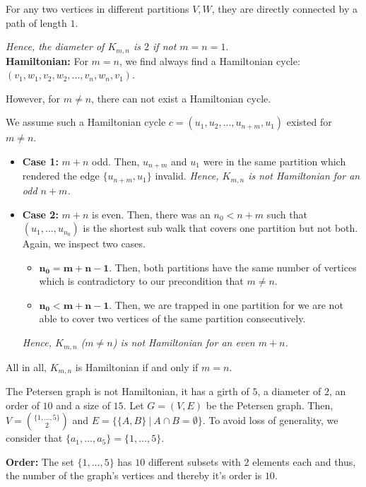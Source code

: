 \documentclass[a4paper]{article}
\begin{document}
\begin{solution}{9}
\begin{theorem}
				For any two vertices in different partitions $V, W$, they are directly connected by a path of length $1$.

				 \emph{Hence, the diameter of $K_{m,n}$ is $2$ if not $m = n = 1$}.\\

			\textbf{Hamiltonian:} For $m = n$, we find always find a Hamiltonian cycle: $(v_1, w_1, v_2, w_2, ..., v_n, w_n, v_1)$.

				However, for $m \neq n$, there can not exist a Hamiltonian cycle.

				We assume such a Hamiltonian cycle $c = (u_1, u_2, ..., u_{n+m}, u_1)$ existed for $m \neq n$. 
				\begin{itemize}
					\item \textbf{Case 1:} $m + n$ odd. Then, $u_{n+m}$ and $u_1$ were in the same partition which rendered the edge $\{u_{n+m}, u_1\}$ invalid. \emph{Hence, $K_{m,n}$ is not Hamiltonian for an odd $n + m$.}
					\item \textbf{Case 2:} $m + n$ is even. Then, there was an $n_0 < n+m$ such that $(u_1, ..., u_{n_0})$ is the shortest sub walk that covers one partition but not both. Again, we inspect two cases.
						\begin{itemize}
							\item $\mathbf{n_0 = m + n - 1}$. Then, both partitions have the same number of vertices which is contradictory to our precondition that $m \neq n$.
							\item $\mathbf{n_0 < m + n - 1}$. Then, we are trapped in one partition for we are not able to cover two vertices of the same partition consecutively.
						\end{itemize}
					\emph{Hence, $K_{m, n}$ ($m \neq n$) is not Hamiltonian for an even $m + n$.}
				\end{itemize}

				All in all, $K_{m,n}$ is Hamiltonian if and only if $m = n$.
		\end{theorem}
			
		\newpage
		\begin{theorem}{The Petersen graph is not Hamiltonian, it has a girth of $5$, a diameter of $2$, an order of $10$ and a size of $15$.}
			Let $G = (V, E)$ be the Petersen graph. Then, $V = \binom{\{1, ..., 5\}}{2}$ and $E = \{\{A, B\}\ |\ A \cap B = \emptyset\}$. To avoid loss of generality, we consider that $\{a_1, ..., a_5\} = \{1, ..., 5\}$.
			
			\textbf{Order:} The set $\{1, ..., 5\}$ has $10$ different subsets with $2$ elements each and thus, the number of the graph's vertices and thereby it's order is $10$.\\
			

\end{theorem}
\end{solution}
\end{document}
